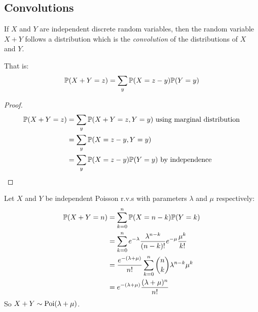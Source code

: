 \documentclass[../main.tex]{subfiles}
\begin{document}
\subsection{Convolutions}
\label{discreteConvolutions}
\begin{proposition}[Convolution]
  If $X$ and $Y$ are independent discrete random variables, then the random variable $X + Y$ follows a distribution which is the \textit{convolution} of the distributions of $X$ and $Y$.
  \label{convolution}

  That is:
  \[
    \P(X + Y = z) = \sum_{y} \P(X = z - y) \P(Y = y)
  \]
\end{proposition}
\begin{proof}
  \begin{align*}
    \P(X + Y = z) &= \sum_{y} \P(X + Y = z, Y = y) \text{ using marginal distribution} \\
                  &= \sum_{y} \P(X = z - y, Y = y) \\
                  &= \sum_{y} \P(X = z - y)\P(Y = y) \text{ by independence}
  \end{align*}
\end{proof}
\begin{example}
  \label{poissonConvolution}
  Let $X$ and $Y$ be independent Poisson r.v.s with parameters $\lambda$ and $\mu$  respectively:
  \begin{align*}
    \P(X + Y = n) &= \sum_{k = 0}^{n} \P(X = n - k) \P(Y = k) \\
                  &= \sum_{k = 0}^{n} e^{-\lambda} \frac{\lambda^{n-k}}{(n - k)!} e^{-\mu} \frac{\mu^{k}}{k!} \\
                  &= \frac{e^{-(\lambda + \mu)}}{n!} \sum_{k = 0}^{n} \binom{n}{k} \lambda^{n - k}\mu^{k}  \\
                  &= e^{-(\lambda + \mu)}\frac{(\lambda + \mu)^{n}}{n!}
  \end{align*}
  So $X + Y \sim \poisson(\lambda + \mu)$.
\end{example}
\end{document}
